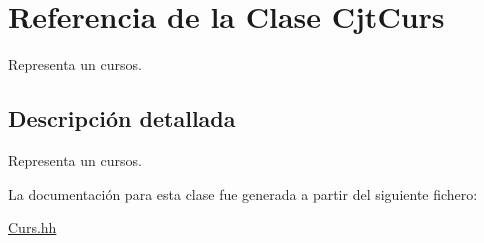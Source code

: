 \hypertarget{class_cjt_curs}{}\section{Referencia de la Clase Cjt\+Curs}
\label{class_cjt_curs}


Representa un cursos.  




\subsection{Descripción detallada}
Representa un cursos. 

La documentación para esta clase fue generada a partir del siguiente fichero\+:\begin{DoxyCompactItemize}
\item 
\mbox{\hyperlink{_curs_8hh}{Curs.\+hh}}\end{DoxyCompactItemize}
